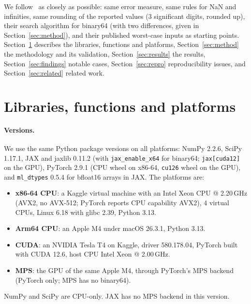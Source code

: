\documentclass[11pt,a4paper]{article}
\begin{document}
We follow~\cite{GIMOZ2026} as closely as possible: same error measure, same rules for NaN and infinities, same rounding of the reported values (3 significant digits, rounded up), their search algorithm for binary64 (with two differences, given in Section~\ref{sec:method}), and their published worst-case inputs as starting points. Section~\ref{sec:setup} describes the libraries, functions and platforms, Section~\ref{sec:method} the methodology and its validation, Section~\ref{sec:results} the results, Section~\ref{sec:findings} notable cases, Section~\ref{sec:repro} reproducibility issues, and Section~\ref{sec:related} related work.

\section{Libraries, functions and platforms}\label{sec:setup}

\paragraph{Versions.} We use the same Python package versions on all platforms: NumPy 2.2.6, SciPy 1.17.1, JAX and jaxlib 0.11.2 (with \texttt{jax\_enable\_x64} for binary64; \texttt{jax[cuda12]} on the GPU), PyTorch 2.9.1 (CPU wheel on x86-64, \texttt{cu126} wheel on the GPU), and \texttt{ml\_dtypes} 0.5.4 for bfloat16 arrays in JAX. The platforms are:
\begin{itemize}
\item \textbf{x86-64 CPU}: a Kaggle virtual machine with an Intel Xeon CPU @ 2.20\,GHz (AVX2, no AVX-512; PyTorch reports CPU capability AVX2), 4 virtual CPUs, Linux 6.18 with glibc 2.39, Python 3.13.
\item \textbf{Arm64 CPU}: an Apple M4 under macOS 26.3.1, Python 3.13.
\item \textbf{CUDA}: an NVIDIA Tesla T4 on Kaggle, driver 580.178.04, PyTorch built with CUDA 12.6, host CPU Intel Xeon @ 2.00\,GHz.
\item \textbf{MPS}: the GPU of the same Apple M4, through PyTorch's MPS backend (PyTorch only; MPS has no binary64).
\end{itemize}
NumPy and SciPy are CPU-only. JAX has no MPS backend in this version.
\end{document}
